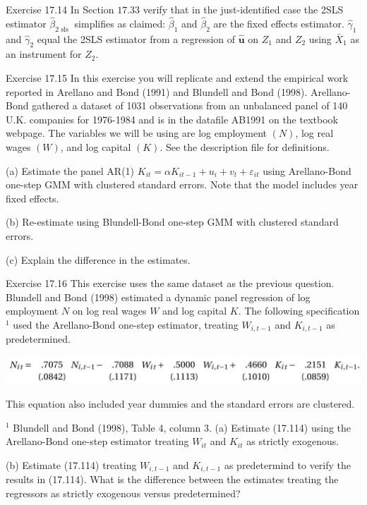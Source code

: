 \documentclass[10pt]{article}
\begin{document}
Exercise 17.14 In Section $17.33$ verify that in the just-identified case the 2SLS estimator $\widehat{\beta}_{2 \text { sls }}$ simplifies as claimed: $\widehat{\beta}_{1}$ and $\widehat{\beta}_{2}$ are the fixed effects estimator. $\widehat{\gamma}_{1}$ and $\widehat{\gamma}_{2}$ equal the 2SLS estimator from a regression of $\widehat{\boldsymbol{u}}$ on $Z_{1}$ and $Z_{2}$ using $\bar{X}_{1}$ as an instrument for $Z_{2}$.

Exercise 17.15 In this exercise you will replicate and extend the empirical work reported in Arellano and Bond (1991) and Blundell and Bond (1998). Arellano-Bond gathered a dataset of 1031 observations from an unbalanced panel of 140 U.K. companies for 1976-1984 and is in the datafile AB1991 on the textbook webpage. The variables we will be using are log employment $(N)$, log real wages $(W)$, and log capital $(K)$. See the description file for definitions.

(a) Estimate the panel AR(1) $K_{i t}=\alpha K_{i t-1}+u_{i}+v_{t}+\varepsilon_{i t}$ using Arellano-Bond one-step GMM with clustered standard errors. Note that the model includes year fixed effects.

(b) Re-estimate using Blundell-Bond one-step GMM with clustered standard errors.

(c) Explain the difference in the estimates.

Exercise 17.16 This exercise uses the same dataset as the previous question. Blundell and Bond (1998) estimated a dynamic panel regression of log employment $N$ on log real wages $W$ and log capital $K$. The following specification ${ }^{1}$ used the Arellano-Bond one-step estimator, treating $W_{i, t-1}$ and $K_{i, t-1}$ as predetermined.

\includegraphics[max width=\textwidth]{2022_10_23_acbfcce1ea7ce1901e2dg-52}

This equation also included year dummies and the standard errors are clustered.

${ }^{1}$ Blundell and Bond (1998), Table 4, column 3. (a) Estimate (17.114) using the Arellano-Bond one-step estimator treating $W_{i t}$ and $K_{i t}$ as strictly exogenous.

(b) Estimate (17.114) treating $W_{i, t-1}$ and $K_{i, t-1}$ as predetermind to verify the results in (17.114). What is the difference between the estimates treating the regressors as strictly exogenous versus predetermined?
\end{document}
